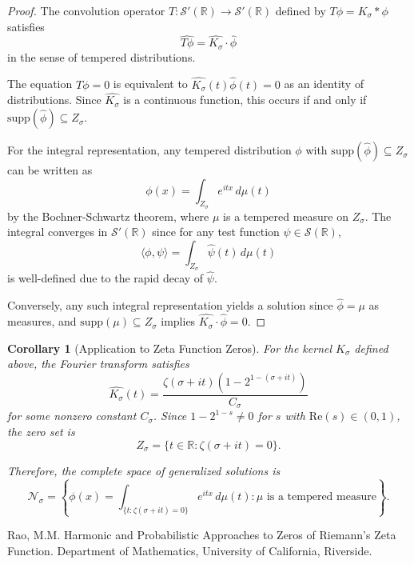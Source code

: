 \documentclass[11pt]{article}
\newtheorem{corollary}{Corollary}
\begin{document}
\begin{proof}
The convolution operator $T: \mathcal{S}'(\mathbb{R}) \to \mathcal{S}'(\mathbb{R})$ defined by $T\phi = K_\sigma * \phi$ satisfies
\begin{equation}
\widehat{T\phi} = \widehat{K_\sigma} \cdot \widehat{\phi}
\end{equation}
in the sense of tempered distributions.

The equation $T\phi = 0$ is equivalent to $\widehat{K_\sigma}(t) \widehat{\phi}(t) = 0$ as an identity of distributions. Since $\widehat{K_\sigma}$ is a continuous function, this occurs if and only if $\text{supp}(\widehat{\phi}) \subseteq Z_\sigma$.

For the integral representation, any tempered distribution $\phi$ with $\text{supp}(\widehat{\phi}) \subseteq Z_\sigma$ can be written as
\begin{equation}
\phi(x) = \int_{Z_\sigma} e^{itx} \, d\mu(t)
\end{equation}
by the Bochner-Schwartz theorem, where $\mu$ is a tempered measure on $Z_\sigma$. The integral converges in $\mathcal{S}'(\mathbb{R})$ since for any test function $\psi \in \mathcal{S}(\mathbb{R})$,
\begin{equation}
\langle \phi, \psi \rangle = \int_{Z_\sigma} \widehat{\psi}(t) \, d\mu(t)
\end{equation}
is well-defined due to the rapid decay of $\widehat{\psi}$.

Conversely, any such integral representation yields a solution since $\widehat{\phi} = \mu$ as measures, and $\text{supp}(\mu) \subseteq Z_\sigma$ implies $\widehat{K_\sigma} \cdot \widehat{\phi} = 0$.
\end{proof}

\begin{corollary}[Application to Zeta Function Zeros]
For the kernel $K_\sigma$ defined above, the Fourier transform satisfies
\begin{equation}
\widehat{K_\sigma}(t) = \frac{\zeta(\sigma + it)(1-2^{1-(\sigma+it)})}{C_\sigma}
\end{equation}
for some nonzero constant $C_\sigma$. Since $1-2^{1-s} \neq 0$ for $s$ with $\text{Re}(s) \in (0,1)$, the zero set is
\begin{equation}
Z_\sigma = \{t \in \mathbb{R} : \zeta(\sigma + it) = 0\}.
\end{equation}

Therefore, the complete space of generalized solutions is
\begin{equation}
\mathcal{N}_\sigma = \left\{ \phi(x) = \int_{\{t: \zeta(\sigma+it)=0\}} e^{itx} \, d\mu(t) : \mu \text{ is a tempered measure} \right\}.
\end{equation}
\end{corollary}

\begin{thebibliography}{9}
 Rao, M.M. Harmonic and Probabilistic Approaches to Zeros of Riemann's Zeta Function. Department of Mathematics, University of California, Riverside.
\end{thebibliography}
\end{document}

